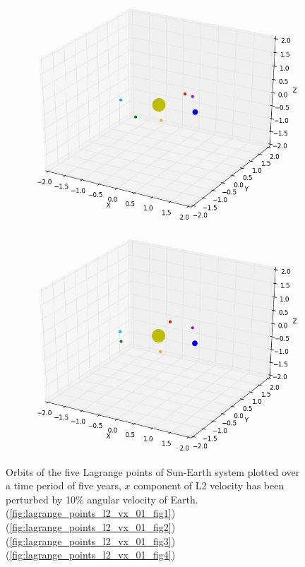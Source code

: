 \documentclass[10pt,letterpaper]{article}
\begin{document}
\begin{figure}[!htb]
  \includegraphics[width=\linewidth]{figures/lagrange_points/lagrange_points_l2_vx_01_3.png}
  \subcaption{}\label{fig:lagrange_points_l2_vx_01_fig3}
\endminipage
{}%
  \includegraphics[width=\linewidth]{figures/lagrange_points/lagrange_points_l2_vx_01_4.png}
  \subcaption{}\label{fig:lagrange_points_l2_vx_01_fig4}
\endminipage
\caption{Orbits of the five Lagrange points of Sun-Earth system plotted over a time period of five years, $x$ component of L2 velocity has been perturbed by 10$\%$ angular velocity of Earth.
(\ref{fig:lagrange_points_l2_vx_01_fig1}) 
(\ref{fig:lagrange_points_l2_vx_01_fig2}) 
(\ref{fig:lagrange_points_l2_vx_01_fig3}) 
(\ref{fig:lagrange_points_l2_vx_01_fig4})}\label{fig:lagrange_points_l2_vx_01}
\end{figure}
\end{document}
